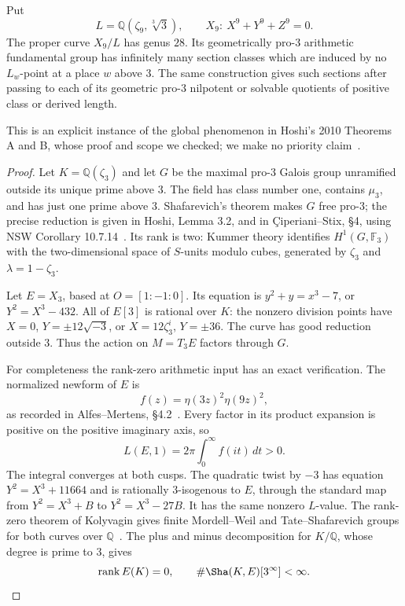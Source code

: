 \begin{theorem}
\label{D-global-prothree}
Put
\[
 L=\mathbb Q(\zeta_9,\sqrt[3]{3}),\qquad
 X_9:\ X^9+Y^9+Z^9=0 .
\]
The proper curve $X_9/L$ has genus $28$. Its
geometrically pro-$3$ arithmetic fundamental
group has infinitely many section classes
which are induced by no $L_w$-point at a
place $w$ above $3$. The same construction
gives such sections after passing to each
of its geometric pro-$3$ nilpotent or
solvable quotients of positive class or
derived length.

This is an explicit instance of the global
phenomenon in Hoshi's 2010 Theorems A and B,
whose proof and scope we checked; we make
no priority claim~\cite{Hoshi2010}.
\end{theorem}
\begin{proof}
Let $K=\mathbb Q(\zeta_3)$ and let $G$ be
the maximal pro-$3$ Galois group unramified
outside its unique prime above $3$.
The field has class number one, contains
$\mu_3$, and has just one prime above $3$.
Shafarevich's theorem makes $G$ free pro-$3$;
the precise reduction is given in
Hoshi, Lemma 3.2, and in
\c{C}iperiani--Stix, \S4, using
NSW Corollary 10.7.14~\cite{CiperianiStix}.
Its rank is two: Kummer theory identifies
$H^1(G,\mathbb F_3)$ with the two-dimensional
space of $S$-units modulo cubes, generated
by $\zeta_3$ and $\lambda=1-\zeta_3$.

Let $E=X_3$, based at $O=[1:-1:0]$.
Its equation is $y^2+y=x^3-7$, or
$Y^2=X^3-432$. All of $E[3]$ is rational
over $K$: the nonzero division points have
$X=0$, $Y=\pm12\sqrt{-3}$, or
$X=12\zeta_3^i$, $Y=\pm36$.
The curve has good reduction outside $3$.
Thus the action on $M=T_3E$ factors through $G$.

For completeness the rank-zero arithmetic input
has an exact verification. The normalized
newform of $E$ is
\[
 f(z)=\eta(3z)^2\eta(9z)^2 ,
\]
as recorded in Alfes--Mertens, \S4.2~\cite{AlfesMertens2024}.
Every factor in its product expansion is
positive on the positive imaginary axis, so
\[
 L(E,1)=2\pi\int_0^\infty f(it)\,dt>0.
\]
The integral converges at both cusps. The
quadratic twist by $-3$ has equation
$Y^2=X^3+11664$ and is rationally
$3$-isogenous to $E$, through the standard
map from $Y^2=X^3+B$ to
$Y^2=X^3-27B$. It has the same nonzero
$L$-value. The rank-zero theorem of
Kolyvagin gives finite Mordell--Weil and
Tate--Shafarevich groups for both curves
over $\mathbb Q$~\cite{Kolyvagin1988}.
The plus and minus decomposition for
$K/\mathbb Q$, whose degree is prime to
$3$, gives
\[
 \operatorname{rank}E(K)=0,\qquad
 \#\Sha(K,E)[3^\infty]<\infty .
\]


\end{proof}
